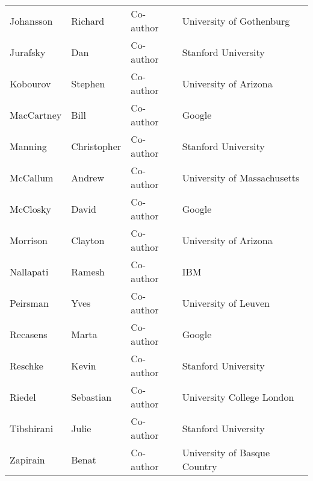 \documentclass[10pt]{article}
\begin{document}
\begin{description}
\begin{center}
\begin{tabular}{l|l|l|l}
Johansson & Richard & Co-author & University of Gothenburg \\
Jurafsky & Dan & Co-author & Stanford University \\
Kobourov & Stephen & Co-author & University of Arizona \\
MacCartney & Bill & Co-author & Google \\
Manning & Christopher & Co-author & Stanford University \\
McCallum & Andrew & Co-author & University of Massachusetts  \\
McClosky & David & Co-author & Google  \\
Morrison & Clayton & Co-author &  University of Arizona \\
Nallapati & Ramesh & Co-author & IBM \\
Peirsman &  Yves & Co-author & University of Leuven \\
Recasens & Marta & Co-author & Google \\
Reschke & Kevin & Co-author & Stanford University \\
Riedel & Sebastian & Co-author & University College London \\
Tibshirani & Julie & Co-author & Stanford University \\
Zapirain & Benat & Co-author & University of Basque Country \\


\end{tabular}
\end{center}


\end{description}
\end{document}

